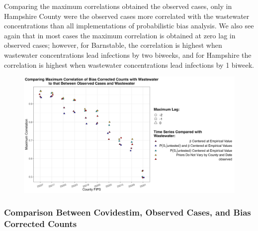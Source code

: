 \documentclass[12pt,twoside]{smiththesis}
\begin{document}
Comparing the maximum correlations obtained the observed cases, only in Hampshire County were the observed cases more correlated with the wastewater concentrations than all implementations of probabilistic bias analysis. We also see again that in most cases the maximum correlation is obtained at zero lag in observed cases; however, for Barnstable, the correlation is highest when wastewater concentrations lead infections by two biweeks, and for Hampshire the correlation is highest when wastewater concentrations lead infections by 1 biweek.
\begin{figure}
\includegraphics[width=1\linewidth]{figure/correlation_observed_pb} \caption{\label{fig:correlation_observed_pb}}\label{fig:unnamed-chunk-9}
\end{figure}
\hypertarget{comparison-between-covidestim-observed-cases-and-bias-corrected-counts}{%
\subsubsection{Comparison Between Covidestim, Observed Cases, and Bias Corrected Counts}\label{comparison-between-covidestim-observed-cases-and-bias-corrected-counts}}
\end{document}

